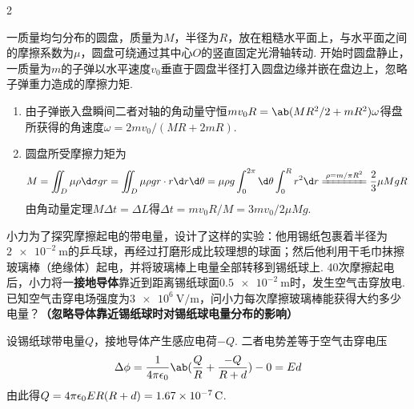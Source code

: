 \documentclass[quiet, fontset = fandol, AutoFakeSlant, 10pt]{ctexart}
\let \emph \textbf
\begin{document}
\begin{paracol}{2}
\begin{problem}[本题10分]
    一质量均匀分布的圆盘，质量为$M$，半径为$R$，放在粗糙水平面上，与水平面之间的摩擦系数为$\mu$，圆盘可绕通过其中心$O$的竖直固定光滑轴转动. 开始时圆盘静止，一质量为$m$的子弹以水平速度$v_0$垂直于圆盘半径打入圆盘边缘并嵌在盘边上，忽略子弹重力造成的摩擦力矩.
    \switchcolumn
    \centering
\end{problem}
\end{paracol}
\begin{solution}\leavevmode
    \begin{enumerate}
        \item 由子弹嵌入盘瞬间二者对轴的角动量守恒$mv_0R=\ab(MR^2/2+mR^2)\omega$得盘所获得的角速度$\omega=2mv_0/(MR+2mR)$.
        \item 圆盘所受摩擦力矩为
        \[M=\iint_D\mu\rho\d\sigma gr=\iint_D\mu\rho gr\cdot r\d r\d\theta=\mu\rho g\int_0^{2\pi}\d\theta\int_0^R r^2\d r\xlongequal{\rho=m/\pi R^2}\frac23\mu MgR\tag*{}\]
        由角动量定理$M\Delta t=\Delta L$得$\Delta t=mv_0R/M=3mv_0/2\mu Mg$.
    \end{enumerate}
\end{solution}

\begin{problem}[本题6分]
    小力为了探究摩擦起电的带电量，设计了这样的实验：他用锡纸包裹着半径为$\qty{2e-2}\m$的乒乓球，再经过打磨形成比较理想的球面；然后他利用干毛巾抹擦玻璃棒（绝缘体）起电，并将玻璃棒上电量全部转移到锡纸球上. 40次摩擦起电后，小力将一\emph{接地导体}靠近到距离锡纸球面$\qty{0.5e-2}\m$时，发生空气击穿放电. 已知空气击穿电场强度为$\qty{3e6}{\V/\m}$，问小力每次摩擦玻璃棒能获得大约多少电量？\emph{（忽略导体靠近锡纸球时对锡纸球电量分布的影响）}
\end{problem}
\begin{solution}
    设锡纸球带电量$Q$，接地导体产生感应电荷$-Q$. 二者电势差等于空气击穿电压
    \[\Delta\phi=\frac{1}{4\pi\epsilon_0}\ab(\frac{Q}{R}+\frac{-Q}{R+d})-0=Ed\]
    由此得$Q=4\pi\epsilon_0ER(R+d)=\qty{1.67e-7}\C$.
\end{solution}
\end{document}
